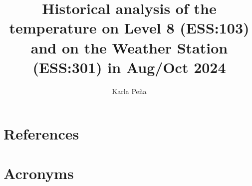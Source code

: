 \documentclass[SE,lsstdraft,authoryear,toc]{lsstdoc}
\title{Historical analysis of the temperature on Level 8 (ESS:103) and on the Weather Station (ESS:301) in Aug/Oct 2024}
\author{%
Karla Peña
}
\date{\vcsDate}
\begin{document}
\maketitle


\appendix
\section{References} \label{sec:bib}
\renewcommand{\refname}{} %


\section{Acronyms} \label{sec:acronyms}

\end{document}
